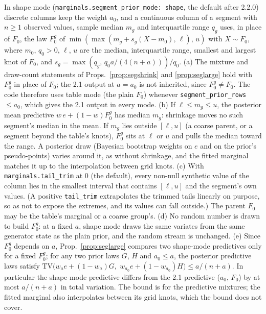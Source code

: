 \setcounter{proposition}{1723}
\begin{proposition}\label{prop:segshape}
In shape mode (\texttt{marginals.segment\_prior\_mode: shape}, the default after 2.2.0) discrete columns keep the weight $a_0$, and a continuous column of a segment with $n\ge1$ observed values, sample median $m_g$ and interquartile range $q_g$ uses, in place of $F_0$, the law $F_0^g$ of $\min(\max(m_g+s_g(X-m_0),\,\ell),\,u)$ with $X\sim F_0$, where $m_0$, $q_0>0$, $\ell$, $u$ are the median, interquartile range, smallest and largest knot of $F_0$, and $s_g=\max(q_g,\,q_0a/(4(n+a)))/q_0$. (a) The mixture and draw-count statements of Props.~\ref{prop:segshrink} and \ref{prop:seglarge} hold with $F_0^g$ in place of $F_0$; the 2.1 output at $a=a_0$ is not inherited, since $F_0^g\ne F_0$. The code therefore uses table mode (the plain $F_0$) whenever \texttt{segment\_prior\_rows} $\le a_0$, which gives the 2.1 output in every mode. (b) If $\ell\le m_g\le u$, the posterior mean predictive $w\,e+(1-w)F_0^g$ has median $m_g$: shrinkage moves no such segment's median in the mean. If $m_g$ lies outside $[\ell,u]$ (a coarse parent, or a segment beyond the table's knots), $F_0^g$ sits at $\ell$ or $u$ and pulls the median toward the range. A posterior draw (Bayesian bootstrap weights on $e$ and on the prior's pseudo-points) varies around it, as without shrinkage, and the fitted marginal matches it up to the interpolation between grid knots. (c) With \texttt{marginals.tail\_trim} at 0 (the default), every non-null synthetic value of the column lies in the smallest interval that contains $[\ell,u]$ and the segment's own values. (A positive \texttt{tail\_trim} extrapolates the trimmed tails linearly on purpose, so as not to expose the extremes, and its values can fall outside.) The parent $F_0$ may be the table's marginal or a coarse group's. (d) No random number is drawn to build $F_0^g$: at a fixed $a$, shape mode draws the same variates from the same generator state as the plain prior, and the random stream is unchanged. (e) Since $F_0^g$ depends on $a$, Prop.~\ref{prop:seglarge} compares two shape-mode predictives only for a fixed $F_0^g$; for any two prior laws $G$, $H$ and $a_0\le a$, the posterior predictive laws satisfy $\mathrm{TV}\big(w_a e+(1-w_a)G,\;w_{a_0}e+(1-w_{a_0})H\big)\le a/(n+a)$. In particular the shape-mode predictive differs from the 2.1 predictive ($a_0$, $F_0$) by at most $a/(n+a)$ in total variation. The bound is for the predictive mixtures; the fitted marginal also interpolates between its grid knots, which the bound does not cover.
\end{proposition}
